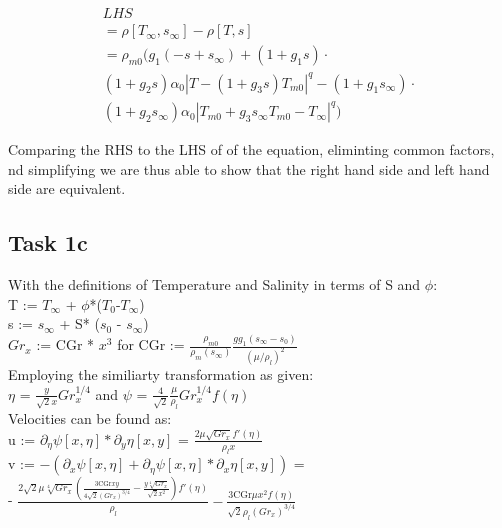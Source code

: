 	\begin{multline*}
		LHS\\
		= \rho[T_\infty,s_\infty]-\rho [T,s]\\ 
		= \rho_{m0} (g_1 (-s+s_\infty)+(1+g_1 s) \cdot \\
		(1+g_2 s) \alpha_0 |T-(1+g_3 s) T_{m0}|^q-(1+g_1 s_\infty) \cdot\\ 
		(1+g_2 s_\infty) \alpha_0 |T_{m0}+g_3 s_\infty T_{m0}-T_\infty|^q)
	\end{multline*}

	Comparing the RHS to the LHS of of the equation, eliminting common factors, nd simplifying we are thus able to show that the right hand side and left hand side are equivalent.

	\subsection*{Task 1c} %
	\label{ssec:Task 1b}
	With the definitions of Temperature and Salinity in terms of S and $\phi$:\\
	T := $T_\infty$ + $\phi$*($T_0$-$T_\infty$)\\
	s := $s_\infty $ + S* ($s_0$ - $s_\infty $)\\
	$Gr_x$ := CGr * $x^3$ for CGr := $\frac{\rho_{m0}}{\rho_m (s_\infty)}\frac{g g_1 (s_\infty-s_0)}{(\mu/\rho_l)^2}$\\

	\noindent Employing the similiarty transformation as given:\\ 
	$\eta$ = $\frac{y}{\sqrt{2}x} Gr_x^{1/4}$ and $\psi$ = $\frac{4}{\sqrt{2}}\frac{\mu}{\rho_l} Gr_x^{1/4} f(\eta)$\\

	\noindent Velocities can be found as:\\
	u := $\partial_\eta \psi [x,\eta ]*\partial _y\eta [x,y]$ = $\frac{2 \mu  \sqrt{Gr_x} f'(\eta )}{\rho_l x}$\\
	v := $-\left(\partial _x\psi [x,\eta ]+\partial _{\eta }\psi [x,\eta ]*\partial _x\eta [x,y]\right) $ = \\ - $\frac{2 \sqrt{2} \mu  \sqrt[4]{Gr_x} \left(\frac{3 \text{CGr} x y}{4 \sqrt{2} \left(Gr_x\right)^{3/4}}-\frac{y \sqrt[4]{Gr_x}}{\sqrt{2} x^2}\right) f'(\eta )}{\rho_l}-\frac{3 \text{CGr} \mu  x^2 f(\eta )}{\sqrt{2} \rho_l \left(Gr_x\right)^{3/4}}$

